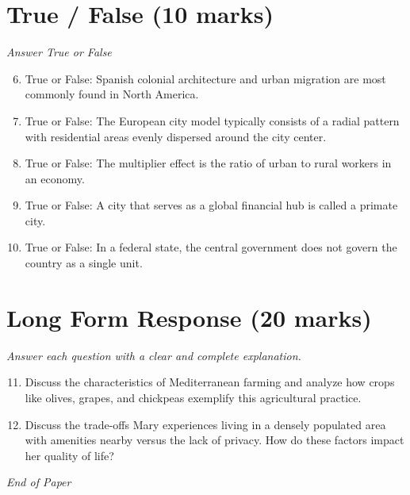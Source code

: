 \documentclass[12pt]{article}
\begin{document}
\section*{True / False (10 marks)}
\textit{Answer True or False}
\begin{enumerate}[label=\arabic*.]
\setcounter{enumi}{5}
\item True or False: Spanish colonial architecture and urban migration are most commonly found in North America.
\item True or False: The European city model typically consists of a radial pattern with residential areas evenly dispersed around the city center.
\item True or False: The multiplier effect is the ratio of urban to rural workers in an economy.
\item True or False: A city that serves as a global financial hub is called a primate city.
\item True or False: In a federal state, the central government does not govern the country as a single unit.
\end{enumerate}

\section*{Long Form Response (20 marks)}
\textit{Answer each question with a clear and complete explanation.}
\begin{enumerate}[label=\arabic*.]
\setcounter{enumi}{10}
\item Discuss the characteristics of Mediterranean farming and analyze how crops like olives, grapes, and chickpeas exemplify this agricultural practice.
\item Discuss the trade-offs Mary experiences living in a densely populated area with amenities nearby versus the lack of privacy. How do these factors impact her quality of life?
\end{enumerate}

\vfill
\noindent\textit{End of Paper}
\end{document}

